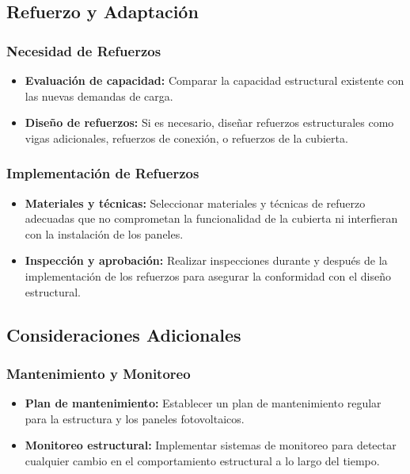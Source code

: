 \documentclass[a4paper,12pt]{article}
\begin{document}
\begin{Form}
\subsection*{Refuerzo y Adaptación}

\subsubsection*{Necesidad de Refuerzos}
\begin{itemize}
    \item \textbf{Evaluación de capacidad:} Comparar la capacidad estructural existente con las nuevas demandas de carga.
    \item \textbf{Diseño de refuerzos:} Si es necesario, diseñar refuerzos estructurales como vigas adicionales, refuerzos de conexión, o refuerzos de la cubierta.
\end{itemize}

\subsubsection*{Implementación de Refuerzos}
\begin{itemize}
    \item \textbf{Materiales y técnicas:} Seleccionar materiales y técnicas de refuerzo adecuadas que no comprometan la funcionalidad de la cubierta ni interfieran con la instalación de los paneles.
    \item \textbf{Inspección y aprobación:} Realizar inspecciones durante y después de la implementación de los refuerzos para asegurar la conformidad con el diseño estructural.
\end{itemize}

\subsection*{Consideraciones Adicionales}

\subsubsection*{Mantenimiento y Monitoreo}
\begin{itemize}
    \item \textbf{Plan de mantenimiento:} Establecer un plan de mantenimiento regular para la estructura y los paneles fotovoltaicos.
    \item \textbf{Monitoreo estructural:} Implementar\cite{idaepctcon} sistemas de monitoreo para detectar cualquier cambio en el comportamiento estructural a lo largo del tiempo.
\end{itemize}


\end{Form}
\end{document}
